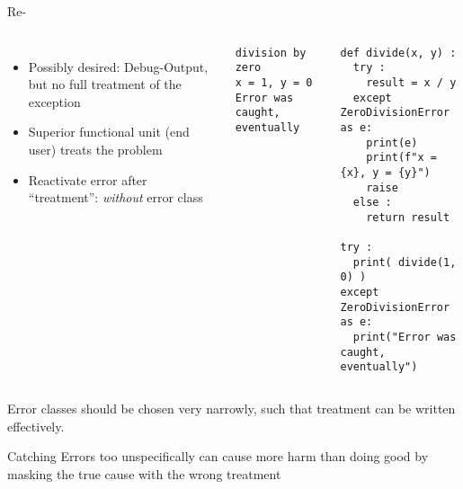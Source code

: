 \begin{frame}[fragile]{Re-}
%
\begin{columns}[T]
\begin{itemize}
\item Possibly desired: Debug-Output, but no full treatment of the exception
\item Superior functional unit (end user) treats the problem
\item[\Thus] Reactivate error after \enquote{treatment}:  \emph{without} error class
\end{itemize}

\vspace{8pt}
\begin{cmdbox}
\begin{verbatim}
division by zero
x = 1, y = 0
Error was caught, eventually
\end{verbatim}
\end{cmdbox}
%
\vspace{-6pt}
\begin{codebox}
\begin{verbatim}
def divide(x, y) :
  try :
    result = x / y
  except ZeroDivisionError as e:
    print(e)
    print(f"x = {x}, y = {y}")
    raise
  else :
    return result

try :
  print( divide(1, 0) )
except ZeroDivisionError as e:
  print("Error was caught, eventually")
\end{verbatim}
\end{codebox}
%
\end{columns}
%
\end{frame}


\begin{frame}[fragile]{}
%
\begin{hintbox}
Error classes should be chosen very narrowly, such that treatment can be written effectively. 

\vspace{6pt}
Catching Errors too unspecifically can cause more harm than doing good by masking the true cause with the wrong treatment
\end{hintbox}
%
\end{frame}

